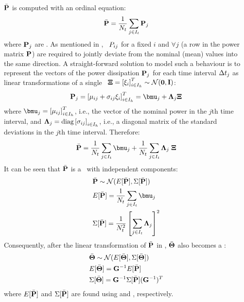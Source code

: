 $\bar{\mathbf{P}}$ is computed with an ordinal equation:
\[
  \bar{\mathbf{P}} = \frac{1}{N_t} \sum_{j \in I_t} \mathbf{P}_j
\]
where $\mathbf{P}_j$ are \mnrvs. As mentioned in , \rvs\ $P_{ij}$ for a fixed $i$ and $\forall j$ (a row in the power matrix $\mathbf{P}$) are required to jointly deviate from the nominal (mean) values into the same direction. A straight-forward solution to model such a behaviour is to represent the vectors of the power dissipation $\mathbf{P}_j$ for each time interval $\Delta t_j$ as linear transformations of a single \msnrv\ $\mathbf{\Xi} = \left[\xi_i\right]^T_{i \in I_h} \sim \mathcal{N}(\mathbf{0}, \mathbf{I})$:
\begin{equation} \equlabel{power-rv}
  \vpower_j = \vector{\mean{ij} + \deviation{ij} \stdnormal_i}_{i \in \nodeindex} = \vmean{j} + \ddeviation{j} \vstdnormal
\end{equation}
where $\vmean{j} = \vector{\mean{ij}}_{i \in \nodeindex}$, i.e., the vector of the nominal power in the $j$th time interval, and $\mathbf{\Lambda}_{j} = \text{diag}\left[\sigma_{ij}\right]_{i \in I_h}$, i.e., a diagonal matrix of the standard deviations in the $j$th time interval. Therefore:
\[
  \a{\vpower} = \frac{1}{\stepcount} \sum_{j \in \timeindex} \vmean{j} + \frac{1}{\stepcount} \sum_{j \in \timeindex} \ddeviation{j} \; \vstdnormal
\]
It can be seen that $\bar{\mathbf{P}}$ is a \mnrv\ with independent components:
\begin{align}
  & \a{\vpower} \sim \normal(\expectation{\a{\vpower}}, \covariance{\a{\vpower}}) \nonumber \\
  & \expectation{\a{\vpower}} = \frac{1}{\stepcount} \sum_{j \in \timeindex} \vmean{j} \equlabel{steady-power-mean} \\
  & \covariance{\a{\vpower}} = \frac{1}{\stepcount^2} \left[ \sum_{j \in \timeindex} \ddeviation{j} \right]^2 \equlabel{steady-power-covariance}
\end{align}
Consequently, after the linear transformation of $\bar{\mathbf{P}}$ in , $\bar{\mathbf{\Theta}}$ also becomes a \mnrv:
\begin{align*}
  & \bar{\mathbf{\Theta}} \sim \mathcal{N}(E[\bar{\mathbf{\Theta}}], \Sigma[\bar{\mathbf{\Theta}}]) \\
  & E[\bar{\mathbf{\Theta}}] = \mathbf{G}^{-1} E[\bar{\mathbf{P}}] \\
  & \Sigma[\bar{\mathbf{\Theta}}] = \mathbf{G}^{-1} \Sigma[\bar{\mathbf{P}}] (\mathbf{G}^{-1})^T
\end{align*}
where $E[\bar{\mathbf{P}}]$ and $\Sigma[\bar{\mathbf{P}}]$ are found using  and , respectively.
